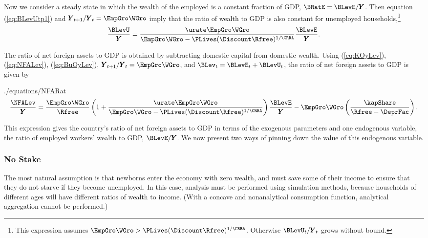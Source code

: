 \documentclass[titlepage]{\econtex}\newcommand{\texname}{cjSOE}
\renewcommand{\GDPLev}{\ensuremath{\pmb{Y}}}
\begin{document}
Now we consider a steady state in which the wealth of the employed is a constant fraction of GDP, $\BRatE = \BLevE /\GDPLev$. Then equation (\ref{eq:BLevUtp1}) and $\GDPLev_{t+1}/\GDPLev_t=\EmpGro \WGro$  imply that the ratio of wealth to GDP is also constant for unemployed households,\footnote{This expression assumes $\EmpGro \WGro >\PLives(\Discount \Rfree )^{1/\CRRA}$. Otherwise $\BLevU_{t} / \GDPLev_t$ grows without bound.}
\begin{equation}
\frac{\BLevU}{\GDPLev}= \frac{\urate \EmpGro \WGro}{\EmpGro \WGro -\PLives(\Discount \Rfree )^{1/\CRRA}} \frac{\BLevE}{\GDPLev}.
\label{eq:BuOyLev}
\end{equation}



The ratio of net foreign assets to GDP is obtained by subtracting domestic capital from domestic wealth. Using (\ref{eq:KOyLev}), (\ref{eq:NFALev}), (\ref{eq:BuOyLev}), $\GDPLev_{t+1}/\GDPLev_t=\EmpGro \WGro$, and $\BLev_t=\BLevE_t+\BLevU_{t}$, the ratio of net foreign assets to GDP is given by
\begin{verbatimwrite}{./equations/NFARat}
\begin{equation}
\frac{\NFALev}{\GDPLev}= \frac{\EmpGro \WGro}{\Rfree} \left( 1 + \frac{\urate \EmpGro \WGro}{\EmpGro \WGro -\PLives(\Discount \Rfree )^{1/\CRRA}} \right) \frac{\BLevE}{\GDPLev} -\EmpGro \WGro\left( \frac{\kapShare}{\Rfree-\DeprFac}\right).
\label{eq:NFARat}
\end{equation}
\end{verbatimwrite}

This expression gives the country's ratio of net foreign assets to GDP in terms of the exogenous parameters and one endogenous variable, the ratio of employed workers' wealth to GDP, $\BLevE/\GDPLev$. We now present two ways of pinning down the value of this endogenous variable.


\subsubsection{No Stake}

The most natural assumption is that newborns enter the economy with zero wealth, and must save some of their income to ensure that they do not starve
if they become unemployed.
In this case, analysis must be performed using simulation methods, because households of different ages will have different ratios of wealth to income.  (With a concave and nonanalytical consumption function, analytical aggregation cannot be performed.)
\end{document}
